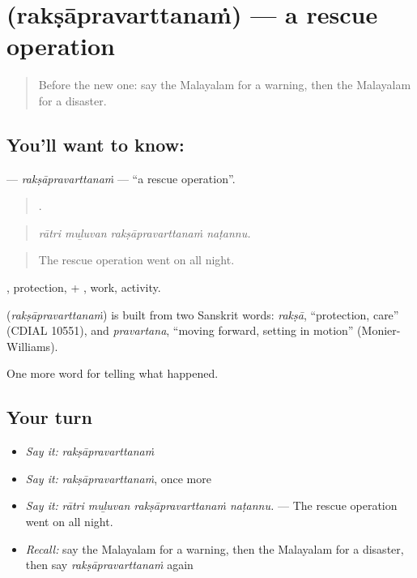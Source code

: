 \section[\texorpdfstring{\ml{രക്ഷാപ്രവർത്തനം} (rakṣāpravarttanaṁ)}{രക്ഷാപ്രവർത്തനം (rakṣāpravarttanaṁ)}]{ (rakṣāpravarttanaṁ) — a rescue operation}

\label{lesson:ML-C374-raksapravarttanam}



\begin{quote}
Before the new one: say the Malayalam for a warning, then the Malayalam for a disaster.
\end{quote}

\subsection*{You'll want to know: }
\textbf{} — \emph{rakṣāpravarttanaṁ} — \textquotedblleft{}a rescue operation\textquotedblright{}.

\begin{quote}
   .
\end{quote}

\begin{quote}
\emph{rātri muḻuvan rakṣāpravarttanaṁ naṭannu.}
\end{quote}

\begin{quote}
The rescue operation went on all night.
\end{quote}

, protection, + , work, activity.

\begin{cousinweb}
\textbf{} (\emph{rakṣāpravarttanaṁ}) is built from two Sanskrit words: \emph{rakṣā}, \textquotedblleft{}protection, care\textquotedblright{} (CDIAL 10551), and \emph{pravartana}, \textquotedblleft{}moving forward, setting in motion\textquotedblright{} (Monier-Williams).
\end{cousinweb}

\begin{grammarlens}[title={What you've built}]
One more word for telling what happened.
\end{grammarlens}

\subsection*{Your turn}
\begin{itemize}
\raggedright
  \item \emph{Say it:} \emph{rakṣāpravarttanaṁ}
  \item \emph{Say it:} \emph{rakṣāpravarttanaṁ}, once more
  \item \emph{Say it:} \emph{rātri muḻuvan rakṣāpravarttanaṁ naṭannu.} — The rescue operation went on all night.
  \item \emph{Recall:} say the Malayalam for a warning, then the Malayalam for a disaster, then say \emph{rakṣāpravarttanaṁ} again
\end{itemize}

